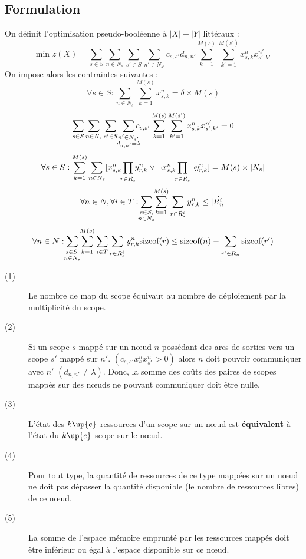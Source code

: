 \documentclass[11pt,a4paper]{article} %
\begin{document}
\subsection{Formulation}
On définit l'optimisation pseudo-booléenne à $|X|+|Y|$ littéraux :
\[
	\mbox{min }z(X) = \sum_{s \in S}\sum_{n \in N_s}\sum_{s' \in S}\sum_{n' \in N_{s'}}c_{s,s'} d_{n,n'}\sum_{k=1}^{M(s)}\sum_{k'=1}^{M(s')}x_{s,k}^n x_{s',k'}^{n'}
\]
On impose alors les contraintes suivantes :
\begin{equation}
\forall s \in S : \sum_{n \in N_s}\sum_{k=1}^{M(s)}x_{s,k}^n= \delta \times M(s)
\end{equation}
\begin{equation}
\sum_{s \in S}\sum_{n \in N_s}\sum_{s' \in S}\hspace{1ex}\smashoperator{\sum_{\substack{n' \in N_{s'} \\ d_{n,n'}=\lambda}}}{c_{s,s'} \sum_{k=1}^{M(s)}\sum_{k'=1}^{M(s')}x_{s,k}^n x_{s',k'}^{n'}} = 0
\end{equation}
\begin{equation}
\forall s \in S : \sum_{k=1}^{M(s)}\sum_{n \in N_s}[x_{s,k}^n \smashoperator{\prod_{r \in \dot{R_s}}} y_{r,k}^n \vee \neg x_{s,k}^n\smashoperator{\prod_{r \in \dot{R_s}}} \neg y_{r,k}^n] = M(s) \times |N_s|
\end{equation}
\begin{equation}
\forall n \in N, \forall i \in T : \smashoperator{\sum_{\substack{s \in S,\\n \in N_s}}}\sum_{k=1}^{M(s)}\sum_{r \in \dot{R_s^i}} y_{r,k}^n \leq |\dot{R_n^i}|
\end{equation}
\begin{equation}
\forall n \in N : \smashoperator{\sum_{\substack{s \in S,\\n \in N_s}}}\sum_{k=1}^{M(s)}\sum_{i \in T}\sum_{r \in \dot{R_s^i}} y_{r,k}^n \mbox{sizeof}(r) \leq \mbox{sizeof}(n) - \sum_{r' \in \overline{R_n}} \mbox{sizeof}(r')
\end{equation}
\begin{description}
\item[(1)] Le nombre de map du scope équivaut au nombre de déploiement par la multiplicité du scope.
\item[(2)] Si un scope $s$ mappé sur un nœud $n$ possédant des arcs de sorties vers un scope $s'$ mappé sur $n'$. $({c_{s,s'} x_s^n  x_{s'}^{n'}}>0)$ alors $n$ doit pouvoir communiquer avec $n'$ $(d_{n,n'} \neq \lambda)$. Donc, la somme des coûts des paires de scopes mappés sur des nœuds ne pouvant communiquer doit être nulle.
\item[(3)] L'état des $k\up{e}$ ressources d'un scope sur un nœud est \textbf{équivalent} à l'état du $k\up{e}$ scope sur le nœud.
\item[(4)] Pour tout type, la quantité de ressources de ce type mappées sur un nœud ne doit pas dépasser la quantité disponible (le nombre de ressources libres) de ce nœud.
\item[(5)] La somme de l'espace mémoire emprunté par les ressources mappés doit être inférieur ou égal à l'espace disponible sur ce nœud.
\end{description}
\end{document}
